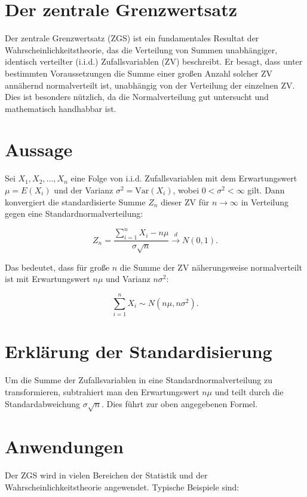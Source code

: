 \documentclass{article}
\begin{document}
\section*{Der zentrale Grenzwertsatz}

Der zentrale Grenzwertsatz (ZGS) ist ein fundamentales Resultat der Wahrscheinlichkeitstheorie, das die Verteilung von Summen unabhängiger, identisch verteilter (i.i.d.) Zufallsvariablen (ZV) beschreibt. Er besagt, dass unter bestimmten Voraussetzungen die Summe einer großen Anzahl solcher ZV annähernd normalverteilt ist, unabhängig von der Verteilung der einzelnen ZV. Dies ist besonders nützlich, da die Normalverteilung gut untersucht und mathematisch handhabbar ist.

\section*{Aussage}

Sei \( X_1, X_2, \dots, X_n \) eine Folge von i.i.d. Zufallsvariablen mit dem Erwartungswert \( \mu = E(X_i) \) und der Varianz \( \sigma^2 = \text{Var}(X_i) \), wobei \( 0 < \sigma^2 < \infty \) gilt. Dann konvergiert die standardisierte Summe \( Z_n \) dieser ZV für \( n \to \infty \) in Verteilung gegen eine Standardnormalverteilung:

\[
Z_n = \frac{\sum_{i=1}^n X_i - n\mu}{\sigma\sqrt{n}} \xrightarrow{d} N(0, 1).
\]

Das bedeutet, dass für große \(n\) die Summe der ZV näherungsweise normalverteilt ist mit Erwartungswert \(n\mu\) und Varianz \(n\sigma^2\):

\[
\sum_{i=1}^n X_i \sim N(n\mu, n\sigma^2).
\]

\section*{Erklärung der Standardisierung}

Um die Summe der Zufallsvariablen in eine Standardnormalverteilung zu transformieren, subtrahiert man den Erwartungswert \(n\mu\) und teilt durch die Standardabweichung \( \sigma\sqrt{n} \). Dies führt zur oben angegebenen Formel.

\section*{Anwendungen}

Der ZGS wird in vielen Bereichen der Statistik und der Wahrscheinlichkeitstheorie angewendet. Typische Beispiele sind:
\end{document}
